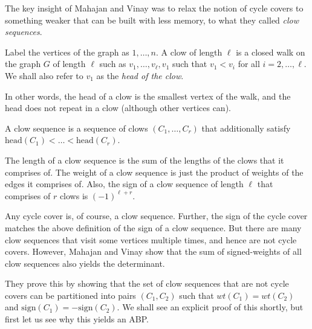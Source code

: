 The key insight of Mahajan and Vinay was to relax the notion of cycle covers to something weaker that can be built with less memory, to what they called \emph{clow sequences}. 

\begin{definition}
Label the vertices of the graph as $1,\dots, n$. 
A clow  of length $\ell$ is a closed walk on the graph $G$ of length $\ell$ such as $v_1,\dots, v_\ell,v_1$ such that $v_1 < v_i$ for all $i=2,\dots, \ell$. 
We shall also refer to $v_1$ as the \emph{head of the clow}. 

In other words, the head of a clow is the smallest vertex of the walk, and the head does not repeat in a clow (although other vertices can). 

A clow sequence is a sequence of clows $(C_1,\dots, C_r)$ that additionally satisfy $\mathrm{head}(C_1) < \dots < \mathrm{head}(C_r)$. 

The length of a clow sequence is the sum of the lengths of the clows that it comprises of. 
The weight of a clow sequence is just the product of weights of the edges it comprises of. 
Also, the sign of a clow sequence of length $\ell$ that comprises of $r$ clows is $(-1)^{\ell + r}$. 
\end{definition}

Any cycle cover is, of course, a clow sequence. 
Further, the sign of the cycle cover matches the above definition of the sign of a clow sequence. 
But there are many clow sequences that visit some vertices multiple times, and hence are not cycle covers. 
However, Mahajan and Vinay show that the sum of signed-weights of all clow sequences also yields the determinant. 

\begin{lemma}[\cite{mv97}]\label{lem:mv-clowseq} If $A_G$ is the adjacency matrix of a graph $G$, then
\begin{eqnarray*}
\det(A_G) & = &  \sum_{C \in \mathrm{CycleCover(G)}} wt(C) \cdot \mathrm{sign}(C)\\
& = & \sum_{C \in \mathrm{ClowSequence(G)}} wt(C) \cdot \mathrm{sign}(C).
\end{eqnarray*},
where $\mathrm{ClowSequence(G)}}$ denotes the set of clow sequences of $G$ of length $n$.
\end{lemma}

They prove this by showing that the set of clow sequences that are not cycle covers can be partitioned into pairs $(C_1,C_2)$ such that $wt(C_1) = wt(C_2)$ and $\mathrm{sign}(C_1) = - \mathrm{sign}(C_2)$. 
We shall see an explicit proof of this shortly, but first let us see why this yields an ABP. \\

